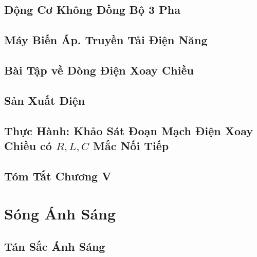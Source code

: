 \documentclass{article}
\numberwithin{equation}{section}
\begin{document}
\subsection{Động Cơ Không Đồng Bộ 3 Pha}


\subsection{Máy Biến Áp. Truyền Tải Điện Năng}


\subsection{Bài Tập về Dòng Điện Xoay Chiều}


\subsection{Sản Xuất Điện}


\subsection{Thực Hành: Khảo Sát Đoạn Mạch Điện Xoay Chiều có $R,L,C$ Mắc Nối Tiếp}


\subsection{Tóm Tắt Chương V}


\section{Sóng Ánh Sáng}

\subsection{Tán Sắc Ánh Sáng}
\end{document}
